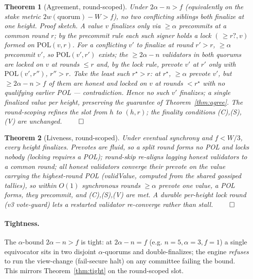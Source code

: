 \documentclass[11pt]{article}
\newtheorem{theorem}{Theorem}
\begin{document}
\begin{theorem}[Agreement, round-scoped]\label{thm:agree-rs}
Under $2\alpha-n>f$ (equivalently on the stake metric $2w(\text{quorum})-W>f$), no two
conflicting siblings both finalize at one height. \emph{Proof sketch.} A value $v$
finalizes only via $\ge\alpha$ precommits at a common round $r$; by the precommit rule
each such signer holds a lock $(\,\ge r? ,v)$ formed on $\mathrm{POL}(v,r)$. For a
conflicting $v'$ to finalize at round $r'>r$, $\ge\alpha$ precommit $v'$, so
$\mathrm{POL}(v',r')$ exists; the $\ge 2\alpha-n$ validators in both quorums are locked on
$v$ at rounds $\le r$ and, by the lock rule, prevote $v'$ at $r'$ only with
$\mathrm{POL}(v',r'')$, $r''>r$. Take the \emph{least} such $r^\star>r$: at $r^\star$,
$\ge\alpha$ prevote $v'$, but $\ge 2\alpha-n>f$ of them are honest and locked on $v$ at
rounds $<r^\star$ with no qualifying earlier POL --- contradiction. Hence no such $v'$
finalizes; a single finalized value per height, preserving the guarantee of
Theorem~\ref{thm:agree}. The round-scoping refines the slot from $h$ to $(h,r)$; the
finality conditions (C),(S),(V) are unchanged. $\qed$
\end{theorem}

\begin{theorem}[Liveness, round-scoped]\label{thm:live-rs}
Under eventual synchrony and $f<W/3$, every height finalizes. Prevotes are fluid, so a
split round forms no POL and locks nobody (locking requires a POL); round-skip re-aligns
lagging honest validators to a common round; all honest validators converge their prevote
on the value carrying the highest-round POL (\emph{validValue}, computed from the shared
gossiped tallies), so within $O(1)$ synchronous rounds $\ge\alpha$ prevote one value, a
POL forms, they precommit, and (C),(S),(V) are met. A durable per-height
\emph{lock round} (v3 vote-guard) lets a restarted validator re-converge rather than
stall. $\qed$
\end{theorem}

\paragraph{Tightness.} The $\alpha$-bound $2\alpha-n>f$ is tight: at $2\alpha-n=f$
(e.g. $n=5,\alpha=3,f=1$) a single equivocator sits in two disjoint $\alpha$-quorums and
double-finalizes; the engine \emph{refuses} to run the view-change (fail-secure halt) on
any committee failing the bound. This mirrors Theorem~\ref{thm:tight} on the round-scoped
slot.
\end{document}
